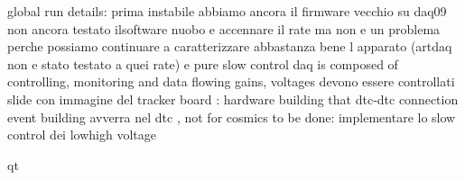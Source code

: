 \documentclass{beamer}[10pt]
\begin{document}
global run details: prima instabile 
abbiamo ancora il firmware vecchio su daq09
non ancora testato ilsoftware nuobo e accennare il rate ma non e un problema perche possiamo continuare a caratterizzare abbastanza bene l apparato (artdaq non e stato testato a quei rate) e pure slow control
daq is composed of controlling, monitoring and data flowing
gains, voltages devono essere controllati
slide con immagine del tracker board : hardware building that dtc-dtc connection
event building avverra nel dtc , not for cosmics
to be done: implementare lo slow control dei lowhigh voltage

qt
\fi
\end{document}
